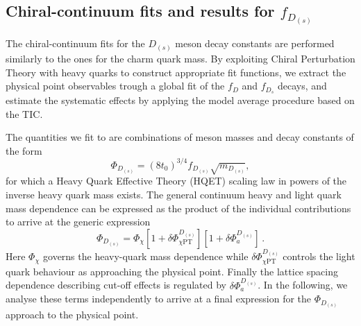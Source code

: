 \subsection{Chiral-continuum fits and results for $f_{D_{(s)}}$}

The chiral-continuum fits for the $D_{(s)}$ meson decay constants are performed similarly to the
ones for the charm quark mass. By exploiting Chiral Perturbation Theory with heavy quarks 
\cite{Grinstein:1992qt, Goity:1992tp} to construct appropriate fit functions, we 
extract the physical point observables trough a global fit of the $f_D$ and $f_{D_s}$ decays,
and estimate the systematic effects by applying the model average procedure based on the TIC.

The quantities we fit to are combinations of meson masses and decay constants of the form
\begin{equation}
  \Phi_{D_{(s)}} = (8t_0)^{3/4}f_{D_{(s)}} \sqrt{m_{D_{(s)}}},
  \label{eq:defphiD}
\end{equation}
for which a Heavy Quark Effective Theory (HQET) scaling law in powers of the inverse
heavy quark mass exists.
The general continuum heavy and light quark mass dependence can be expressed as the product of the individual contributions to arrive at the generic expression 
\begin{equation}
	\Phi_{D_{(s)}} = \Phi_{\chi} \left[
	1 + \delta\Phi_{\chi\mathrm{PT}}^{D_{(s)}}
	\right]
	\left[
	1 + \delta\Phi_a^{D_{(s)}}
	\right]\,.
	\label{eq:fds_different_pieces}
\end{equation}
Here $\Phi_\chi$ governs the heavy-quark mass dependence while  $\delta\Phi_{\chi\mathrm{PT}}^{D_{(s)}}$ controls the light quark behaviour as approaching the physical point. Finally the lattice spacing dependence describing cut-off effects is regulated by $\delta\Phi_a^{D_{(s)}}$. In the following, we analyse these terms independently to arrive at a final expression for the $\Phi_{D_{(s)}}$ approach to the physical point.

